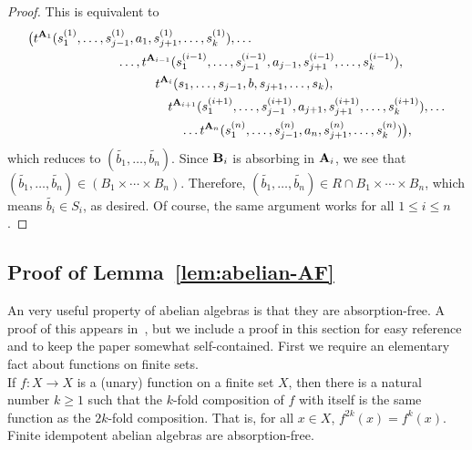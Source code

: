 \begin{proof}
This is equivalent to 
  \begin{align*}
    & \bigl( t^{\mathbf{A}_1}(s_1^{(1)},\dots,s_{j-1}^{(1)},a_1, s_{j+1}^{(1)},\dots,s_{k}^{(1)}),\dots \\
    & \qquad \qquad \qquad\quad \dots, t^{\mathbf{A}_{i-1}}(s_1^{(i-1)}, \dots, s_{j-1}^{(i-1)}, a_{j-1}, s_{j+1}^{(i-1)}, \dots, 
s_{k}^{(i-1)}),\\
    & \qquad \qquad \qquad\quad \quad\quad \quad t^{\mathbf{A}_{i}}(s_1, \dots, s_{j-1}, b, s_{j+1}, \dots, s_{k}),\\
    & \qquad \qquad \qquad\quad \quad \quad \quad \quad t^{\mathbf{A}_{i+1}}(s_1^{(i+1)}, \dots, s_{j-1}^{(i+1)}, a_{j+1}, s_{j
+1}^{(i+1)}, \dots, s_{k}^{(i+1)}), \dots\\
    & \qquad \qquad \qquad\quad \quad \quad \quad \quad \quad  \dots t^{\mathbf{A}_n}(s_1^{(n)}, \dots, s_{j-1}^{(n)}, a_n, 
s_{j+1}^{(n)}, \dots, s_{k}^{(n)}) \bigr),
  \end{align*}
which reduces to $(\tilde{b_1},\dots, \tilde{b_{n}})$.
  Since $\mathbf{B}_i$ is absorbing in $\mathbf{A}_i$, we see that 
  $(\tilde{b_1},\dots, \tilde{b_{n}})\in (B_1 \times \cdots \times B_n)$.
  Therefore, 
  $(\tilde{b_1},\dots, \tilde{b_{n}})\in R\cap B_1 \times \cdots \times B_n$,
  which means $\tilde{b_i}\in S_i$, as desired. Of course, the same argument 
  works for all $1\leq i\leq n$. 
\end{proof}



\subsection{Proof of Lemma~\ref{lem:abelian-AF}}
\label{sec:proof-that-abelian}
An very useful property of abelian algebras is that they are absorption-free.
A proof of this appears in~\cite[Lem~4.1]{MR3374664}, but we include 
a proof in this section for easy reference and to keep the paper somewhat self-contained.
First we require an elementary fact about functions on finite sets.\\[4pt]
  If $f: X \rightarrow X$ is a (unary) function on a finite set $X$, then there
  is a natural number $k\geq 1$ 
  such that the $k$-fold composition of $f$ with itself
  is the same function as the $2k$-fold composition.  That is, for all 
  $x \in X$, $f^{2k}(x) = f^k(x)$.\\[6pt]
Finite idempotent abelian algebras are absorption-free.

